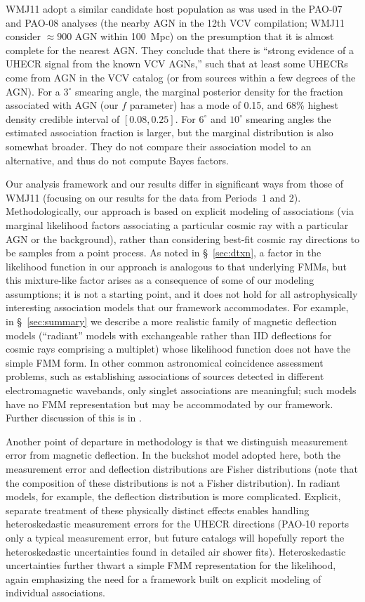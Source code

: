 WMJ11 adopt a similar candidate host population as was used in the PAO-07 and
PAO-08 analyses (the nearby AGN in the 12th VCV compilation; WMJ11 consider
$\approx 900$ AGN within 100~Mpc) on the presumption that it is almost
complete for the nearest AGN.  They conclude that there is ``strong evidence
of a UHECR signal from the known VCV AGNs,'' such that at least some UHECRs
come from AGN in the VCV catalog (or from sources within a few degrees of the
AGN).  For a $3^\circ$ smearing angle, the marginal posterior density for the
fraction associated with AGN (our $f$ parameter) has a mode of 0.15, and 68\%
highest density credible interval of $[0.08, 0.25]$.  For $6^\circ$ and
$10^\circ$ smearing angles the estimated association fraction is larger, but
the marginal distribution is also somewhat broader.  They do not compare their
association model to an alternative, and thus do not compute Bayes factors.

Our analysis framework and our results differ in significant ways from those
of WMJ11 (focusing on our results for the data from Periods~1 and 2). 
Methodologically, our approach is based on explicit modeling of associations
(via marginal likelihood factors associating a particular cosmic ray with a
particular AGN or the background), rather than considering best-fit cosmic
ray directions to be samples from a point process.  As noted in
\S~\ref{sec:dtxn}, a factor in the likelihood function in our approach
is analogous to that underlying FMMs, but this
mixture-like factor arises as a consequence of some of our modeling
assumptions; it is not a starting point, and it does not hold for all
astrophysically interesting association models that our framework
accommodates.  For example, in \S~\ref{sec:summary} we describe a more
realistic family of magnetic deflection models (``radiant'' models with
exchangeable rather than IID deflections for cosmic rays comprising a
multiplet) whose likelihood function does not have the simple FMM form.  In
other common astronomical coincidence assessment problems, such as
establishing associations of sources detected in different electromagnetic
wavebands, only singlet associations are meaningful; such models have no FMM
representation but may be accommodated by our framework.  Further
discussion of this is in \cite{Loredo12-Coinc}.

Another point of departure in methodology is that we distinguish measurement
error from magnetic deflection.  In the buckshot model adopted here, both
the measurement error and deflection distributions are Fisher distributions
(note that the composition of these distributions is not a Fisher
distribution).  In radiant models, for example, the deflection distribution
is more complicated.  Explicit, separate treatment of these physically
distinct effects enables handling heteroskedastic measurement errors
for the UHECR directions (PAO-10 reports only a typical measurement
error, but future catalogs will hopefully report the heteroskedastic
uncertainties found in detailed air shower fits).  Heteroskedastic
uncertainties further thwart a simple FMM representation for the likelihood,
again emphasizing the need for a framework built on explicit modeling
of individual associations.

